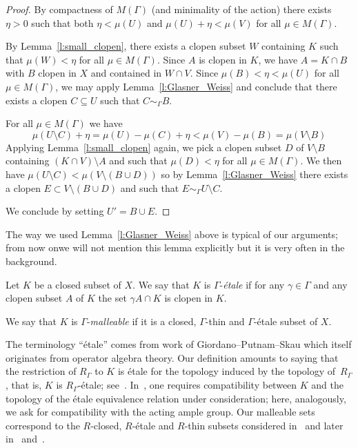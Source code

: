 \documentclass[AHL,Unicode]{cedram}
\begin{document}
\begin{proof}
By compactness of $M(\Gamma)$ (and minimality of the action) there exists $\eta >0$ such that both $\eta < \mu(U)$ and $\mu(U)+ \eta < \mu(V)$ for all $\mu \in M(\Gamma)$.

By Lemma~\ref{l:small_clopen}, there exists a clopen subset $W$ containing $K$ such that $\mu(W)< \eta$ for all $\mu \in M(\Gamma)$. Since $A$ is clopen in $K$, we have $A=K \cap B$ with $B$ clopen in $X$ and contained in $W \cap V$. Since $\mu(B) < \eta < \mu(U)$ for all $\mu \in M(\Gamma)$, we may apply Lemma~\ref{l:Glasner_Weiss} and conclude that there exists a clopen $C \subseteq U$ such that $C \sim_\Gamma B$.

For all $\mu \in M(\Gamma)$ we have
\[
\mu(U \setminus C) +\eta = \mu(U) - \mu(C) + \eta < \mu(V)-\mu(B) = \mu(V \setminus B)
\]
Applying Lemma~\ref{l:small_clopen} again, we pick a clopen subset $D$ of $V \setminus B$ containing $(K \cap V) \setminus A$ and such that $\mu(D)< \eta$ for all $\mu \in M(\Gamma)$. We then have $\mu(U \setminus C) < \mu(V \setminus (B \cup D))$ so by Lemma~\ref{l:Glasner_Weiss} there exists a clopen $E \subset V \setminus (B \cup D)$ and such that $E \sim_\Gamma U\setminus C$.

We conclude by setting $U'=B \cup E$.
\end{proof}

The way we used Lemma~\ref{l:Glasner_Weiss} above is typical of our arguments; from now on\linebreak we will not mention this lemma explicitly but it is very often in the background.

\begin{defi}
Let $K$ be a closed subset of $X$. We say that $K$ is $\Gamma$-\emph{étale} if for any $\gamma \in \Gamma$ and any clopen subset $A$ of $K$ the set $\gamma A \cap K$ is clopen in $K$.

We say that $K$ is $\Gamma$-\emph{malleable} if it is a closed, $\Gamma$-thin and $\Gamma$-étale subset of $X$.
\end{defi}

The terminology ``étale'' comes from work of Giordano--Putnam--Skau which itself originates from operator algebra theory. Our definition amounts to saying that the restriction of $R_\Gamma$ to $K$ is étale for the topology induced by the topology of~$R_\Gamma$, that is, $K$ is $R_\Gamma$-étale; see~\cite[Definition~2.1]{Giordano2004}. In~\cite{Giordano2004}, one requires compatibility between $K$ and the topology of the étale equivalence relation under consideration; here, analogously, we ask for compatibility with the acting ample group. Our malleable sets correspond to the $R$-closed, $R$-étale and $R$-thin subsets considered in~\cite{Giordano2004} and later in~\cite{Giordano2008} and~\cite{Matui2008}.
\end{document}
